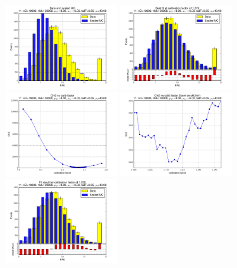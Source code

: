 
 \begin{figure}[htbp] \begin{center} 
\includegraphics[width=0.45\textwidth]{../FIGURES/11/FIG_Data_and_scaled_MC.pdf} 
\includegraphics[width=0.45\textwidth]{../FIGURES/11/FIG_Best_fit_at_calibration_factor_of_1_372.pdf} 
\includegraphics[width=0.45\textwidth]{../FIGURES/11/FIG_Chi2_vs_calib_factor.pdf} 
\includegraphics[width=0.45\textwidth]{../FIGURES/11/FIG_Chi2_vs_calib_factor_Zoom_on_chi2min.pdf} 
\includegraphics[width=0.45\textwidth]{../FIGURES/11/FIG_Fit_result_for_calibration_factor_of_1_252.pdf} 

\end{center}
\end{figure}
